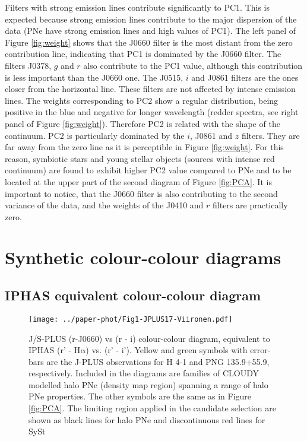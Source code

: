 \documentclass{article}
\newcommand\ha{\ensuremath{\mathrm{H\alpha}}}
\begin{document}
Filters with strong emission lines contribute significantly to PC1. This is expected because strong emission lines contribute to the major dispersion of the data (PNe have strong emission lines and high values of PC1). The left panel of Figure \ref{fig:weight} shows that the J0660 filter is the most distant from the zero contribution line, indicating that PC1 is dominated by the J0660 filter. The filters J0378, \(g\) and \(r\) also contribute to the PC1 value, although this contribution is less important than the J0660 one. The J0515, \(i\) and J0861 filters are the ones closer from the horizontal line. These filters are not affected by intense emission lines. The weights corresponding to PC2 show a regular distribution, being positive in the blue and negative for longer wavelength (redder spectra, see right panel of Figure \ref{fig:weight}). Therefore PC2 is related with the shape of the continuum. PC2 is particularly dominated by the  \(i\), J0861 and \(z\) filters. They are far away from the zero line as it is perceptible in Figure \ref{fig:weight}. For this reason, symbiotic stars and young stellar objects (sources with intense red continuum) are found to exhibit higher PC2 value compared to PNe and to be located at the upper part of the second diagram of Figure \ref{fig:PCA}. It is important to notice, that the J0660 filter is also contributing to the second variance of the data, and the weights of the J0410  and \(r\) filters are practically zero.

\section{Synthetic colour-colour diagrams}
\label{sec:colour}

\subsection{IPHAS equivalent colour-colour diagram}
\label{sec:iphas}

\begin{SCfigure}
\centering
  \texttt{[image: ../paper-phot/Fig1-JPLUS17-Viironen.pdf]}
  \caption{J/S-PLUS (r-J0660) vs (r - i) colour-colour diagram, equivalent to IPHAS (r' - \ha{}) vs. (r' - i'). Yellow and green symbols with error-bars are the J-PLUS observations for H 4-1 and PNG 135.9+55.9, respectively. Included in the
diagrams are families of CLOUDY modelled halo PNe (density map region) spanning a range of halo PNe properties. The other symbols are the same as in Figure \ref{fig:PCA}. The limiting region applied in the candidate selection are shown as black lines for halo PNe and discontinuous red lines for SySt} 
  \label{fig:Viironen}
\end{SCfigure}
\end{document}
